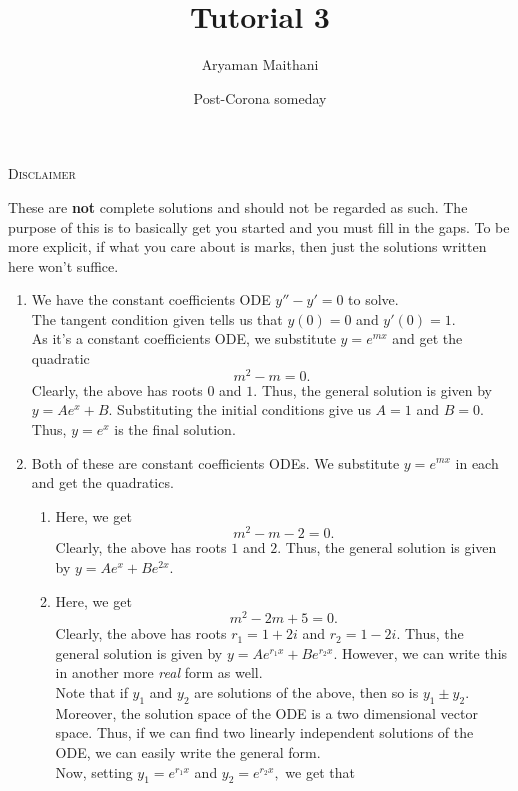 \documentclass{article}
\title{Tutorial 3}				%
\author{Aryaman Maithani}
\date{Post-Corona someday}		%
\begin{document}
\maketitle

\hrulefill

\begin{center}
	\textsc{Disclaimer}
\end{center}
These are \textbf{not} complete solutions and should not be regarded as such. The purpose of this is to basically get you started and you must fill in the gaps. To be more explicit, if what you care about is marks, then just the solutions written here won't suffice.

\hrulefill

\begin{enumerate}[label = Q.\arabic*.] 
	\item We have the constant coefficients ODE $y'' - y' = 0$ to solve.\\
	The tangent condition given tells us that $y(0) = 0$ and $y'(0) = 1.$\\
	As it's a constant coefficients ODE, we substitute $y = e^{mx}$ and get the quadratic
	\[m^2 - m = 0.\]
	Clearly, the above has roots $0$ and $1.$ Thus, the general solution is given by $y = Ae^x + B.$ Substituting the initial conditions give us $A = 1$ and $B = 0.$\\
	Thus, $y = e^x$ is the final solution.
	\item \label{q2} Both of these are constant coefficients ODEs. We substitute $y = e^{mx}$ in each and get the quadratics.
	\begin{enumerate}[label = (\roman*)] 
		\item Here, we get
		\[m^2 - m - 2 = 0.\]
		Clearly, the above has roots $1$ and $2.$ Thus, the general solution is given by $y = Ae^x + Be^{2x}.$ 
		\item Here, we get
		\[m^2 - 2m + 5 = 0.\]
		Clearly, the above has roots $r_1 = 1 + 2i$ and $r_2 = 1 - 2i.$ Thus, the general solution is given by $y = Ae^{r_1x} + Be^{r_2x}.$ However, we can write this in another more \emph{real} form as well.\\
		Note that if $y_1$ and $y_2$ are solutions of the above, then so is $y_1 \pm y_2.$ Moreover, the solution space of the ODE is a two dimensional vector space. Thus, if we can find two linearly independent solutions of the ODE, we can easily write the general form.\\
		Now, setting $y_1 = e^{r_1x}$ and $y_2 = e^{r_2x},$ we get that
		\begin{align*} 

\end{align*}
\end{enumerate}
\end{enumerate}
\end{document}
